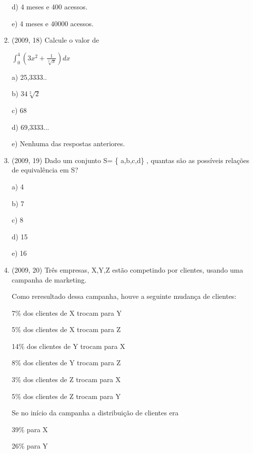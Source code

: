 \documentclass{article}
\begin{document}
\begin{enumerate}
d) 4 meses e 400 acessos.

e) 4 meses e 40000 acessos.\newline



\item(2009, 18) Calcule o valor de

$\int_0^4 (3x^2 + \frac{1}{\sqrt[2]{x}})dx $


a) 25,3333..

b) $34\sqrt[2]{2}$

c) 68

d) 69,3333...

e) Nenhuma das respostas anteriores.\newline









\item(2009, 19) Dado um conjunto S= \{ a,b,c,d\} , quantas são as possíveis relações de equivalência em S?

a) 4

b) 7

c) 8

d) 15

e) 16 \newline







\item(2009, 20) Três empresas, X,Y,Z estão competindo por clientes, usando uma campanha de
marketing.

Como reresultado dessa campanha, houve a seguinte mudança de clientes:\newline

7\% dos clientes de X trocam para Y

5\% dos clientes de X trocam para Z

14\% dos clientes de Y trocam para X

8\% dos clientes de Y trocam para Z

3\% dos clientes de Z trocam para X

5\% dos clientes de Z trocam para Y \newline


Se no início da campanha a distribuição de clientes era\newline


39\% para X

26\% para Y


\end{enumerate}
\end{document}
